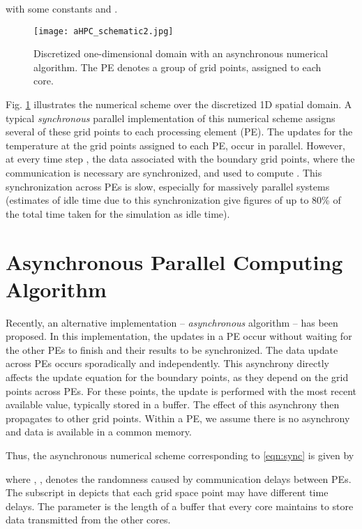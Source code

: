\documentclass[1p]{elsarticle}
\begin{document}
with some constants  and .

\begin{figure}[h!]
\begin{center}
\texttt{[image: aHPC\_schematic2.jpg]}
\caption{Discretized one-dimensional domain with an asynchronous numerical algorithm. The PE denotes a group of grid points, assigned to each core.}\label{fig.0}
\end{center}
\end{figure}
Fig. \ref{fig.0} illustrates the numerical scheme over the discretized 1D spatial domain. A typical \textit{synchronous} parallel implementation of this numerical scheme  assigns several of these grid points to each processing element (PE). The updates for the temperature at the grid points assigned to each PE, occur in parallel. However, at every time step , the data associated with the boundary grid points, where the communication is necessary are synchronized, and used to compute . This synchronization across PEs is slow, especially for massively parallel systems (estimates of idle time due to this synchronization give figures of up to 80\% of the total time taken for the simulation as idle time). 

\section{Asynchronous Parallel Computing Algorithm}
Recently, an alternative implementation -- \textit{asynchronous} algorithm -- has been proposed. In this implementation, the updates in a PE occur without waiting for the other PEs to finish and their results to be synchronized. The data update across PEs occurs sporadically and independently. This asynchrony directly affects the update equation for the boundary points, as they depend on the grid points across PEs. For these points, the update is performed with the most recent available value, typically stored in a buffer. The effect of this asynchrony then propagates to other grid points. Within a PE, we assume there is no asynchrony and data is available in a common memory. 

Thus, the asynchronous numerical scheme corresponding to \eqref{eqn:sync} is given by

where , , denotes the randomness caused by communication delays between PEs. The subscript  in  depicts that each grid space point may have different time delays.
The parameter  is the length of a buffer that every core maintains to store data transmitted from the other cores. 
\end{document}
